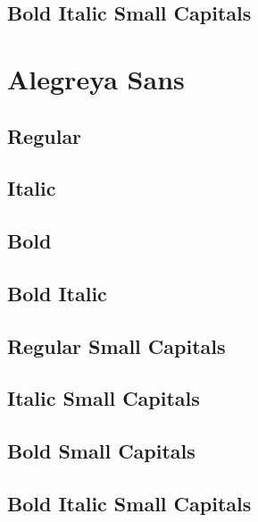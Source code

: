 \documentclass[12pt]{article}
\begin{document}
\subsection*{Bold Italic Small Capitals}

\textsc{\textbf{\textit{\lipsum[4]}}}

\section{Alegreya Sans}\sf

\subsection*{Regular}
\lipsum[1]

\subsection*{Italic}
\textit{\lipsum[2]} 

\subsection*{Bold}
\textbf{\lipsum[3]}

\subsection*{Bold Italic}

\textbf{\textit{\lipsum[4]}}

\subsection*{Regular Small Capitals}
\textsc{\lipsum[1]}

\subsection*{Italic Small Capitals}
\textsc{\textit{\lipsum[2]}}

\subsection*{Bold Small Capitals}
\textsc{\textbf{\lipsum[3]}}

\subsection*{Bold Italic Small Capitals}

\textsc{\textbf{\textit{\lipsum[4]}}}
\end{document}

